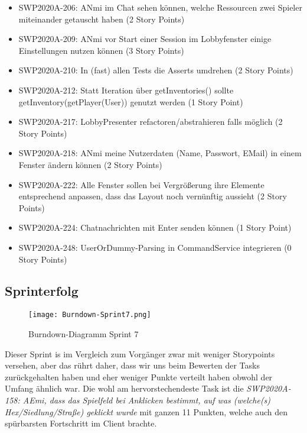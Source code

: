 \documentclass[12pt,a4paper, oneside]{article}
\begin{document}
\begin{itemize}
\item SWP2020A-206: ANmi im Chat sehen können, welche Ressourcen zwei Spieler miteinander getauscht haben (2 Story Points)

\item SWP2020A-209: ANmi vor Start einer Session im Lobbyfenster einige Einstellungen nutzen können (3 Story Points)

\item SWP2020A-210: In (fast) allen Tests die Asserts umdrehen (2 Story Points)

\item SWP2020A-212: Statt Iteration über getInventories() sollte getInventory(getPlayer(User)) genutzt werden (1 Story Point)

\item SWP2020A-217: LobbyPresenter refactoren/abstrahieren falls möglich (2 Story Points)

\item SWP2020A-218: ANmi meine Nutzerdaten (Name, Passwort, EMail) in einem Fenster ändern können (2 Story Points)

\item SWP2020A-222: Alle Fenster sollen bei Vergrößerung ihre Elemente entsprechend anpassen, dass das Layout noch vernünftig aussieht (2 Story Points)

\item SWP2020A-224: Chatnachrichten mit Enter senden können (1 Story Point)

\item SWP2020A-248: UserOrDummy-Parsing in CommandService integrieren (0 Story Points)

\end{itemize}

\newpage
\subsection{Sprinterfolg}
\begin{figure}[h]
    \centering
    \texttt{[image: Burndown-Sprint7.png]}
    \caption{Burndown-Diagramm Sprint 7}
    \label{fig: Burndown-Sprint7}
\end{figure}
\noindent
Dieser Sprint is im Vergleich zum Vorgänger zwar mit weniger Storypoints versehen, aber das rührt daher,
dass wir uns beim Bewerten der Tasks zurückgehalten haben und eher weniger Punkte verteilt haben obwohl
der Umfang ähnlich war.
Die wohl am hervorstechendeste Task ist die \textit{SWP2020A-158: AEmi, dass das Spielfeld bei Anklicken bestimmt, auf was (welche(s) Hex/Siedlung/Straße) geklickt wurde} mit ganzen 11 Punkten, welche auch den spürbarsten Fortschritt
im Client brachte.
\end{document}
